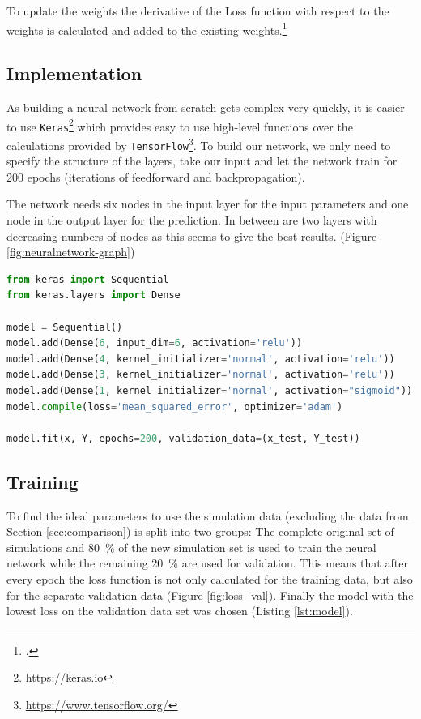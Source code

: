 To update the weights the derivative of the Loss function with respect to the weights is calculated and added to the existing weights.\footcite{NN-python}

\subsection{Implementation}

As building a neural network from scratch gets complex very quickly, it is easier to use \texttt{Keras}\footnote{\url{https://keras.io}} which provides easy to use high-level functions over the calculations provided by \texttt{TensorFlow}\footnote{\url{https://www.tensorflow.org/}}. To build our network, we only need to specify the structure of the layers, take our input and let the network train for 200 epochs (iterations of feedforward and backpropagation). 

The network needs six nodes in the input layer for the input parameters and one node in the output layer for the prediction. In between are two layers with decreasing numbers of nodes as this seems to give the best results. (Figure \ref{fig:neuralnetwork-graph})

\begin{lstlisting}[language=Python,caption=the used model as Keras code,label=lst:model]
from keras import Sequential
from keras.layers import Dense

model = Sequential()
model.add(Dense(6, input_dim=6, activation='relu'))
model.add(Dense(4, kernel_initializer='normal', activation='relu'))
model.add(Dense(3, kernel_initializer='normal', activation='relu'))
model.add(Dense(1, kernel_initializer='normal', activation="sigmoid"))
model.compile(loss='mean_squared_error', optimizer='adam')

model.fit(x, Y, epochs=200, validation_data=(x_test, Y_test))

\end{lstlisting}

\subsection{Training}

To find the ideal parameters to use the simulation data (excluding the data from Section \ref{sec:comparison}) is split into two groups: The complete original set of simulations and \SI{80}{\percent} of the new simulation set is used to train the neural network while the remaining \SI{20}{\percent} are used for validation. This means that after every epoch the loss function is not only calculated for the training data, but also for the separate validation data (Figure \ref{fig:loss_val}). Finally the model with the lowest loss on the validation data set was chosen (Listing \ref{lst:model}).


